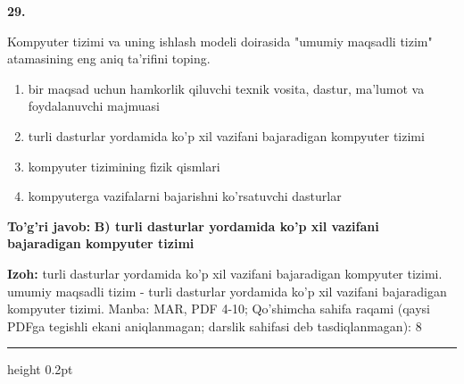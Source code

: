 \documentclass[10pt,a4paper]{article}
\begin{document}
{\bfseries\sffamily\color{ink} 29.}
\par
Kompyuter tizimi va uning ishlash modeli doirasida "umumiy maqsadli tizim" atamasining eng aniq ta'rifini toping.
\begin{enumerate}[label=\Alph*),leftmargin=9mm]
\item bir maqsad uchun hamkorlik qiluvchi texnik vosita, dastur, ma'lumot va foydalanuvchi majmuasi
\item turli dasturlar yordamida ko'p xil vazifani bajaradigan kompyuter tizimi
\item kompyuter tizimining fizik qismlari
\item kompyuterga vazifalarni bajarishni ko'rsatuvchi dasturlar
\end{enumerate}
\begin{tcolorbox}[enhanced,breakable,colback=teal!4,colframe=teal!60!black,boxrule=0.45pt,arc=1.2mm,left=2.7mm,right=2.7mm,top=1.8mm,bottom=1.8mm,before skip=2mm,after skip=2mm]
{\bfseries\sffamily\color{teal}To'g'ri javob:} \textbf{B) turli dasturlar yordamida ko'p xil vazifani bajaradigan kompyuter tizimi}
\par\smallskip
{\bfseries Izoh:} turli dasturlar yordamida ko'p xil vazifani bajaradigan kompyuter tizimi. umumiy maqsadli tizim - turli dasturlar yordamida ko'p xil vazifani bajaradigan kompyuter tizimi. Manba: MAR, PDF 4-10; Qo'shimcha sahifa raqami (qaysi PDFga tegishli ekani aniqlanmagan; darslik sahifasi deb tasdiqlanmagan): 8
\end{tcolorbox}
\vspace{2mm}\hrule height 0.2pt\vspace{3mm}
\end{document}
